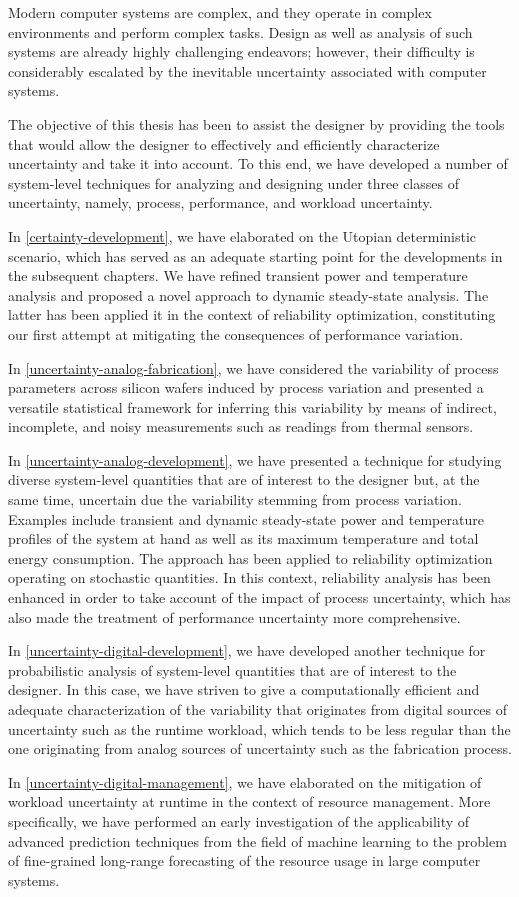 Modern computer systems are complex, and they operate in complex environments
and perform complex tasks. Design as well as analysis of such systems are
already highly challenging endeavors; however, their difficulty is considerably
escalated by the inevitable uncertainty associated with computer systems.

The objective of this thesis has been to assist the designer by providing the
tools that would allow the designer to effectively and efficiently characterize
uncertainty and take it into account. To this end, we have developed a number of
system-level techniques for analyzing and designing under three classes of
uncertainty, namely, process, performance, and workload uncertainty.

In \cref{certainty-development}, we have elaborated on the Utopian deterministic
scenario, which has served as an adequate starting point for the developments in
the subsequent chapters. We have refined transient power and temperature
analysis and proposed a novel approach to dynamic steady-state analysis. The
latter has been applied it in the context of reliability optimization,
constituting our first attempt at mitigating the consequences of performance
variation.

In \cref{uncertainty-analog-fabrication}, we have considered the variability of
process parameters across silicon wafers induced by process variation and
presented a versatile statistical framework for inferring this variability by
means of indirect, incomplete, and noisy measurements such as readings from
thermal sensors.

In \cref{uncertainty-analog-development}, we have presented a technique for
studying diverse system-level quantities that are of interest to the designer
but, at the same time, uncertain due the variability stemming from process
variation. Examples include transient and dynamic steady-state power and
temperature profiles of the system at hand as well as its maximum temperature
and total energy consumption. The approach has been applied to reliability
optimization operating on stochastic quantities. In this context, reliability
analysis has been enhanced in order to take account of the impact of process
uncertainty, which has also made the treatment of performance uncertainty more
comprehensive.

In \cref{uncertainty-digital-development}, we have developed another technique
for probabilistic analysis of system-level quantities that are of interest to
the designer. In this case, we have striven to give a computationally efficient
and adequate characterization of the variability that originates from digital
sources of uncertainty such as the runtime workload, which tends to be less
regular than the one originating from analog sources of uncertainty such as the
fabrication process.

In \cref{uncertainty-digital-management}, we have elaborated on the mitigation
of workload uncertainty at runtime in the context of resource management.
More specifically, we have performed an early investigation of the applicability
of advanced prediction techniques from the field of machine learning to the
problem of fine-grained long-range forecasting of the resource usage in large
computer systems.
